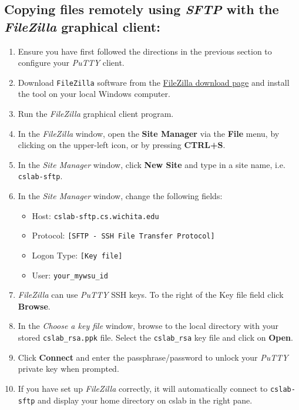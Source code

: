 \documentclass[12pt]{article}
\begin{document}
\begin{flushleft}
\subsection*{Copying files remotely using \textit{SFTP} with the \textit{FileZilla} graphical client:}
\begin{enumerate}
  \item Ensure you have first followed the directions in the previous section to configure your \textit{PuTTY} client.
  \item Download \texttt{FileZilla} software from the \href{https://filezilla-project.org/download.php?type=client}{FileZilla download page} and install the tool on your local Windows computer.
  \item Run the \textit{FileZilla} graphical client program.
  \item In the \textit{FileZilla} window, open the \textbf{Site Manager} via the \textbf{File} menu, by clicking on the upper-left icon, or by pressing \textbf{CTRL+S}.
  \item In the \textit{Site Manager} window, click \textbf{New Site} and type in a site name, i.e. \verb|cslab-sftp|.
  \item In the \textit{Site Manager} window, change the following fields:
  \begin{itemize}
    \item Host: \verb|cslab-sftp.cs.wichita.edu|
    \item Protocol: \verb|[SFTP - SSH File Transfer Protocol]|
    \item Logon Type: \verb|[Key file]|
    \item User: \verb|your_mywsu_id|
  \end{itemize}
  \item \textit{FileZilla} can use \textit{PuTTY} SSH keys. To the right of the Key file field click \textbf{Browse}.
  \item In the \textit{Choose a key file} window, browse to the local directory with your stored \verb|cslab_rsa.ppk| file. Select the \texttt{cslab\_rsa} key file and click on \textbf{Open}.
  \item Click \textbf{Connect} and enter the passphrase/password to unlock your \textit{PuTTY} private key when prompted.
  \item If you have set up \textit{FileZilla} correctly, it will automatically connect to \verb|cslab-sftp| and display your home directory on cslab in the right pane.

\end{enumerate}
\end{flushleft}
\end{document}
